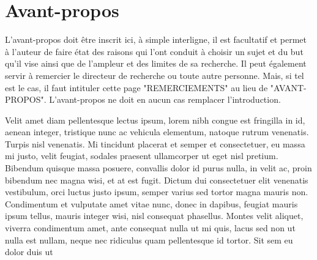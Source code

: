 \chapter*{Avant-propos}

L'avant-propos doit être inscrit ici, à simple interligne, il est facultatif
et permet à l'auteur de faire état des raisons qui l'ont conduit à choisir
un sujet et du but qu'il vise ainsi que de l'ampleur et des limites de sa
recherche. Il peut également servir à remercier le directeur de recherche ou
toute autre personne. Mais, si tel est le cas, il faut intituler cette page
"REMERCIEMENTS" au lieu de "AVANT-PROPOS". L'avant-propos ne doit en aucun
cas remplacer l'introduction.

Velit amet diam pellentesque lectus ipsum,
lorem nibh congue est fringilla in id, aenean integer, tristique nunc ac
vehicula elementum, natoque rutrum venenatis. Turpis nisl venenatis. Mi
tincidunt placerat et semper et consectetuer, eu massa mi justo, velit
feugiat, sodales praesent ullamcorper ut eget nisl pretium. Bibendum quisque
massa posuere, convallis dolor id purus nulla, in velit ac, proin bibendum
nec magna wisi, et at est fugit. Dictum dui consectetuer elit venenatis
vestibulum, orci luctus justo ipsum, semper varius sed tortor magna mauris
non. Condimentum et vulputate amet vitae nunc, donec in dapibus, feugiat
mauris ipsum tellus, mauris integer wisi, nisl consequat phasellus. Montes
velit aliquet, viverra condimentum amet, ante consequat nulla ut mi quis,
lacus sed non ut nulla est nullam, neque nec ridiculus quam pellentesque id
tortor. Sit sem eu dolor duis ut
